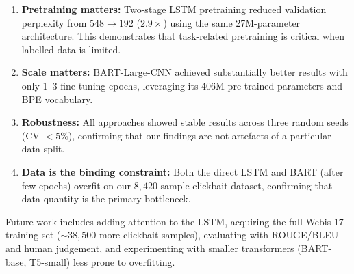 \documentclass{article}
\begin{document}
\begin{enumerate}
\item \textbf{Pretraining matters:} Two-stage LSTM pretraining reduced validation perplexity from $548 \rightarrow 192$ ($2.9\times$) using the same 27M-parameter architecture.
This demonstrates that task-related pretraining is critical when labelled data is limited.

\item \textbf{Scale matters:} BART-Large-CNN achieved substantially better results with only 1--3 fine-tuning epochs, leveraging its 406M pre-trained parameters and BPE vocabulary.

\item \textbf{Robustness:} All approaches showed stable results across three random seeds (CV ${<}5\%$), confirming that our findings are not artefacts of a particular data split.

\item \textbf{Data is the binding constraint:} Both the direct LSTM and BART (after few epochs) overfit on our $8{,}420$-sample clickbait dataset, confirming that data quantity is the primary bottleneck.
\end{enumerate}

Future work includes adding attention to the LSTM, acquiring the full Webis-17 training set (${\sim}38{,}500$ more clickbait samples), evaluating with ROUGE/BLEU and human judgement, and experimenting with smaller transformers (BART-base, T5-small) less prone to overfitting.

\newpage
\end{document}
